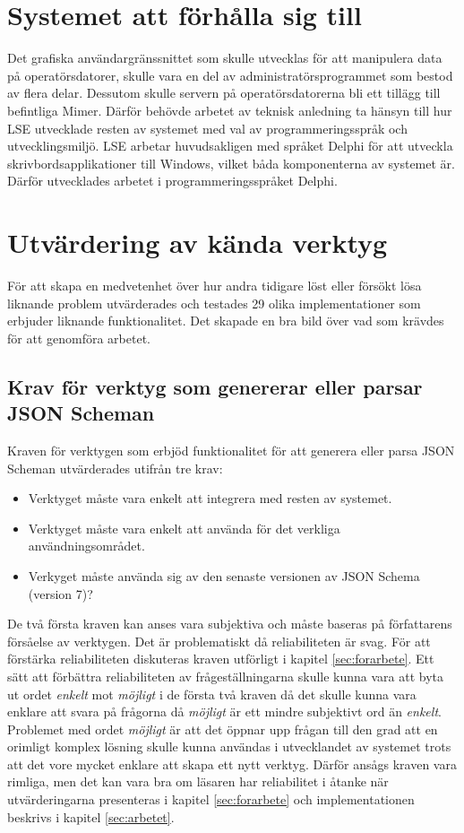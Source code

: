 \section{Systemet att förhålla sig till}
\label{sec:metod:förhålla}
Det grafiska användargränssnittet som skulle utvecklas för att manipulera data på operatörsdatorer, skulle vara en del av administratörsprogrammet som bestod av flera delar. Dessutom skulle servern på operatörsdatorerna bli ett tillägg till befintliga Mimer. Därför behövde arbetet av teknisk anledning ta hänsyn till hur LSE utvecklade resten av systemet med val av programmeringsspråk och utvecklingsmiljö. LSE arbetar huvudsakligen med språket Delphi för att utveckla skrivbordsapplikationer till Windows, vilket båda komponenterna av systemet är. Därför utvecklades arbetet i programmeringsspråket Delphi.

\section{Utvärdering av kända verktyg}
\label{sec:metod:utvärdering-verktyg}
För att skapa en medvetenhet över hur andra tidigare löst eller försökt lösa liknande problem utvärderades och testades 29 olika implementationer som erbjuder liknande funktionalitet. Det skapade en bra bild över vad som krävdes för att genomföra arbetet.

\subsection{Krav för verktyg som genererar eller parsar JSON Scheman}
Kraven för verktygen som erbjöd funktionalitet för att generera eller parsa JSON Scheman utvärderades utifrån tre krav:

\begin{itemize}
	\item Verktyget måste vara enkelt att integrera med resten av systemet.
	\item Verktyget måste vara enkelt att använda för det verkliga användningsområdet.
	\item Verkyget måste använda sig av den senaste versionen av JSON Schema (version 7)?
\end{itemize}

De två första kraven kan anses vara subjektiva och måste baseras på författarens försåelse av verktygen. Det är problematiskt då reliabiliteten är svag. För att förstärka reliabiliteten diskuteras kraven utförligt i kapitel \ref{sec:forarbete}. Ett sätt att förbättra reliabiliteten av frågeställningarna skulle kunna vara att byta ut ordet \textit{enkelt} mot \textit{möjligt} i de första två kraven då det skulle kunna vara enklare att svara på frågorna då \textit{möjligt} är ett mindre subjektivt ord än \textit{enkelt}. Problemet med ordet \textit{möjligt} är att det öppnar upp frågan till den grad att en orimligt komplex lösning skulle kunna användas i utvecklandet av systemet trots att det vore mycket enklare att skapa ett nytt verktyg. Därför ansågs kraven vara rimliga, men det kan vara bra om läsaren har reliabilitet i åtanke när utvärderingarna presenteras i kapitel \ref{sec:forarbete} och implementationen beskrivs i kapitel \ref{sec:arbetet}.

